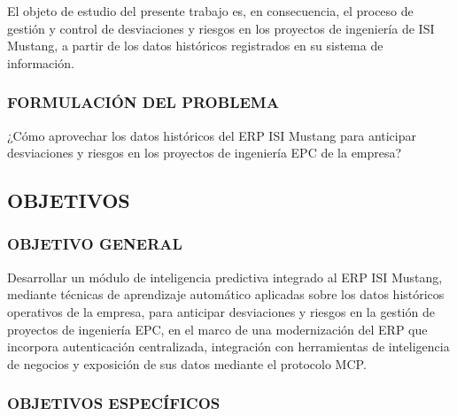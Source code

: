 El objeto de estudio del presente trabajo es, en consecuencia, el proceso de gestión y control de desviaciones y riesgos en los proyectos de ingeniería de ISI Mustang, a partir de los datos históricos registrados en su sistema de información.

\subsubsection{FORMULACIÓN DEL PROBLEMA}

¿Cómo aprovechar los datos históricos del ERP ISI Mustang para anticipar desviaciones y riesgos en los proyectos de ingeniería EPC de la empresa?

\subsection{OBJETIVOS}

\subsubsection{OBJETIVO GENERAL}

Desarrollar un módulo de inteligencia predictiva integrado al ERP ISI Mustang, mediante técnicas de aprendizaje automático aplicadas sobre los datos históricos operativos de la empresa, para anticipar desviaciones y riesgos en la gestión de proyectos de ingeniería EPC, en el marco de una modernización del ERP que incorpora autenticación centralizada, integración con herramientas de inteligencia de negocios y exposición de sus datos mediante el protocolo MCP.

\subsubsection{OBJETIVOS ESPECÍFICOS}

